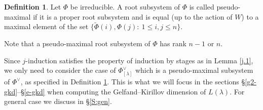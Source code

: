 \documentclass[reqno,12pt]{amsart}
\numberwithin{equation}{section}
\theoremstyle{plain}
\theoremstyle{definition}
\newtheorem{Defff}[Thm]{Definition}
\newcommand{\lam}{\lambda}
\newcommand{\ep}{\varepsilon}
\renewcommand{\subset}{\subseteq}
\newcommand{\lest}{\leqslant}
\renewcommand{\leq}{\leqslant}
\begin{document}
\begin{Defff}\label{thmbd}
	Let $\Phi$ be irreducible. A root subsystem of $\Phi$ is called pseudo-maximal if it is a proper root subsystem and is equal (up to the action of $W$) to a maximal element of the set
$\{\tilde{\Phi}(i), \Phi(j): \ 1\lest i, j \lest n \}$.
\end{Defff}

Note that a pseudo-maximal root subsystem of $\Phi$ has rank $n-1 $ or $n$. 


Since $j$-induction satisfies the property of induction by stages as in Lemma \ref{j.1}, we only need to consider the case of $\Phi_{[\lam]}^\vee$ which is a pseudo-maximal subsystem of $\Phi^\vee$, as specified in Definition \ref{thmbd}. This is what we will focus in the sections \S \ref{g2-gkd}--\S \ref{e-gkd} when computing the Gelfand--Kirillov dimension of $L(\lambda)$. For general case we discuss in \S \ref{S:gen}.









\end{document}
